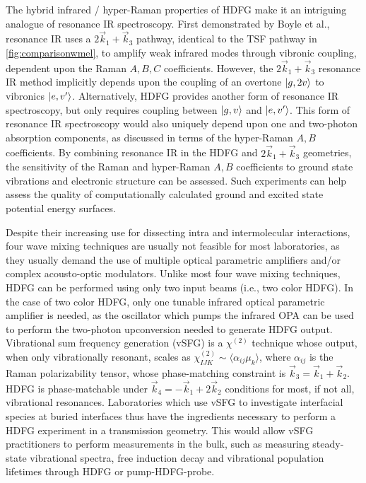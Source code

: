 \documentclass[aip, jcp, reprint, onecolumn]{revtex4-2}
\begin{document}
The hybrid infrared / hyper-Raman properties of HDFG make it an intriguing analogue of resonance IR spectroscopy.
First demonstrated by Boyle et al., resonance IR uses a $2\vec{k}_1 + \vec{k}_3$ pathway, identical to the TSF pathway in \autoref{fig:comparisonwmel}, to amplify weak infrared modes through vibronic coupling, dependent upon the Raman $A,B,C$ coefficients. \cite{RN491}
However, the $2\vec{k}_1 + \vec{k}_3$ resonance IR method implicitly depends upon the coupling of an overtone $\ket{g,2v}$ to vibronics $\ket{e,v'}$.
Alternatively, HDFG provides another form of resonance IR spectroscopy, but only requires coupling between $\ket{g,v}$ and $\ket{e,v'}$.
This form of resonance IR spectroscopy would also uniquely depend upon one and two-photon absorption components, as discussed in terms of the hyper-Raman $A,B$ coefficients.
By combining resonance IR in the HDFG and $2\vec{k}_1 + \vec{k}_3$ geometries, the sensitivity of the Raman and hyper-Raman $A,B$ coefficients to ground state vibrations and electronic structure can be assessed. 
Such experiments can help assess the quality of computationally calculated ground and excited state potential energy surfaces. 

Despite their increasing use for dissecting intra and intermolecular interactions, four wave mixing techniques are usually not feasible for most laboratories, as they usually demand the use of multiple optical parametric amplifiers and/or complex acousto-optic modulators. \cite{Chen2016}
Unlike most four wave mixing techniques, HDFG can be performed using only two input beams (i.e., two color HDFG).
In the case of two color HDFG, only one tunable infrared optical parametric amplifier is needed, as the oscillator which pumps the infrared OPA can be used to perform the two-photon upconversion needed to generate HDFG output.
Vibrational sum frequency generation (vSFG) is a $\chi^{(2)}$ technique whose output, when only vibrationally resonant, scales as $\chi^{(2)}_{IJK} \sim \langle \alpha_{ij} \mu_k \rangle$, where $\alpha_{ij}$ is the Raman polarizability tensor, whose phase-matching constraint is  $\vec{k}_3 = \vec{k}_1 + \vec{k}_2$.
HDFG is phase-matchable under $\vec{k}_4 = -\vec{k}_1 + 2\vec{k}_2$ conditions for most, if not all, vibrational resonances.
Laboratories which use vSFG to investigate interfacial species at buried interfaces thus have the ingredients necessary to perform a HDFG experiment in a transmission geometry. \cite{Piontek2023_1}
This would allow vSFG practitioners to perform measurements in the bulk, such as measuring steady-state vibrational spectra, free induction decay and vibrational population lifetimes through HDFG or pump-HDFG-probe.
 
\end{document}
